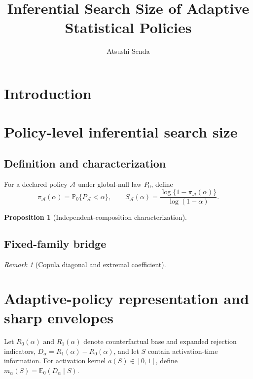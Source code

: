 \documentclass[11pt]{article}
\title{Inferential Search Size of Adaptive Statistical Policies}
\author{Atsushi Senda}
\date{}
\newtheorem{proposition}[theorem]{Proposition}
\theoremstyle{definition}
\theoremstyle{remark}
\newtheorem{remark}[theorem]{Remark}
\newcommand{\Pzero}{\mathbb P_0}
\newcommand{\Ezero}{\mathbb E_0}
\begin{document}
\maketitle

\begin{abstract}
\end{abstract}

\section{Introduction}

\section{Policy-level inferential search size}
\subsection{Definition and characterization}
For a declared policy $\mathcal A$ under global-null law $P_0$, define
\[
\pi_{\mathcal A}(\alpha)=\Pzero\{P_{\mathcal A}<\alpha\},\qquad
S_{\mathcal A}(\alpha)=
\frac{\log\{1-\pi_{\mathcal A}(\alpha)\}}{\log(1-\alpha)}.
\]

\begin{proposition}[Independent-composition characterization]
\end{proposition}

\subsection{Fixed-family bridge}
\begin{remark}[Copula diagonal and extremal coefficient]
\end{remark}

\section{Adaptive-policy representation and sharp envelopes}
Let $R_0(\alpha)$ and $R_1(\alpha)$ denote counterfactual base and
expanded rejection indicators, $D_\alpha=R_1(\alpha)-R_0(\alpha)$,
and let $S$ contain activation-time information. For activation kernel
$a(S)\in[0,1]$, define $m_\alpha(S)=\Ezero(D_\alpha\mid S)$.
\end{document}
